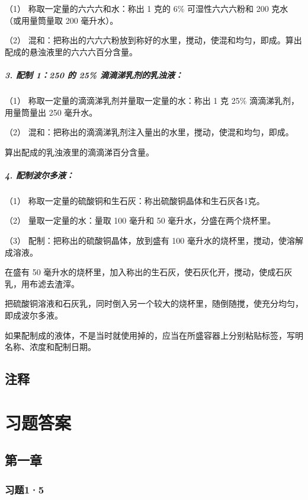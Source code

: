 （1） 称取一定量的六六六和水：称出 1 克的 6\% 可湿性六六六粉和 200 克水
（或用量筒量取 200 毫升水）。

（2）
混和：把称出的六六六粉放到称好的水里，搅动，使混和均匀，即成。算出配成的悬浊液里的六六六百分含量。

\paragraph{3. 配制 1：250 的 25\% 滴滴涕乳剂的乳浊液：}

（1） 称取一定量的滴滴涕乳剂并量取一定量的水：称出 1 克 25\%
滴滴涕乳剂，用量筒量出 250 毫升水。

（2） 混和：把称出的滴滴涕乳剂注入量出的水里，搅动，使混和均匀，即成。

算出配成的乳浊液里的滴滴涕百分含量。

\paragraph{4. 配制波尔多液：}

（1） 称取一定量的硫酸铜和生石灰：称出硫酸铜晶体和生石灰各1克。

（2） 量取一定量的水：量取 100 毫升和 50 毫升水，分盛在两个烧杯里。

（3） 配制：把称出的硫酸铜晶体，放到盛有 100
毫升水的烧杯里，搅动，使溶解成溶液。

在盛有 50
毫升水的烧杯里，加入称出的生石灰，使石灰化开，搅动，使成石灰乳，用布滤去渣滓。

把硫酸铜溶液和石灰乳，同时倒入另一个较大的烧杯里，随倒随搅，使充分均匀，即成波尔多液。

如果配制成的液体，不是当时就使用掉的，应当在所盛容器上分别粘贴标签，写明名称、浓度和配制日期。

\section{注释}

\chapter{习题答案}

\section{第一章}

\subsection{习题1·5}

